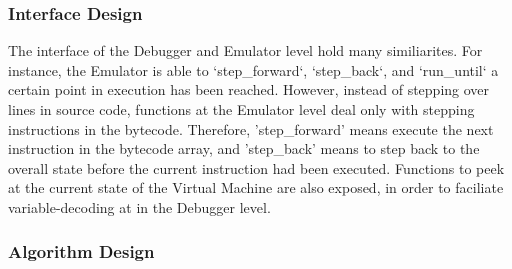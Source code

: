 \documentclass{report}
\begin{document}
    \subsubsection{Interface Design}
        The interface of the Debugger and Emulator level hold many similiarites. For instance, the Emulator is able to `step\_forward`, `step\_back`, and `run\_until` a certain point in execution has been reached. However, instead of stepping over lines in source code, functions at the Emulator level deal only with stepping instructions in the bytecode. Therefore, 'step\_forward' means execute the next instruction in the bytecode array, and 'step\_back' means to step back to the overall state before the current instruction had been executed. Functions to peek at the current state of the Virtual Machine are also exposed, in order to faciliate variable-decoding at in the Debugger level.

    \subsubsection{Algorithm Design}

\begin{figure}[!h]
\centering
\end{figure}
\end{document}
